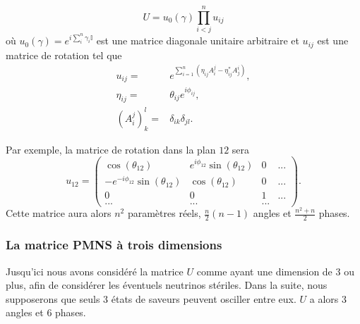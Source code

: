             \begin{equation}\label{eq::compact_pmns}
                U=u_0(\gamma)\prod_{i<j}^n u_{ij}
            \end{equation}
            où $u_0(\gamma)=e^{i \sum_{i}^{n}\gamma_i \mathbb{I}}$ est une matrice diagonale unitaire arbitraire et $u_{ij}$ est une matrice de rotation tel que
            \begin{equation}
                \begin{split}
                    u_{ij}= & e^{\sum_{i=1}^n\left(\eta_{ij}A_i^j-\eta_{ij}^*A_j^i\right)},\\
                    \eta_{ij} = & \theta_{ij}e^{i\phi_{ij}},\\
                    \left(A_i^j\right)_k^l = & \delta_{ik}\delta_{jl}.
                \end{split}
            \end{equation}
            
            Par exemple, la matrice de rotation dans la plan $12$ sera
            \begin{equation}
                u_{12} = 
                \left(\begin{matrix}
                    \cos(\theta_{12}) & e^{i\phi_{12}}\sin(\theta_{12}) & 0 & ... \\
                    -e^{-i\phi_{12}}\sin(\theta_{12}) & \cos(\theta_{12}) & 0 & ... \\
                    0 & 0 & 1 & ... \\
                    ... & ... & ... &
                \end{matrix}\right).
            \end{equation}
            Cette matrice aura alors $n^2$ paramètres réels, $\frac{n}{2}(n-1)$ angles  et $\frac{n^2+n}{2}$ phases.
            
            \subsubsection{La matrice PMNS à trois dimensions}
            Jusqu'ici nous avons considéré la matrice $U$ comme ayant une dimension de 3 ou plus, afin de considérer les éventuels neutrinos stériles. Dans la suite, nous supposerons que seuls 3 états de saveurs peuvent osciller entre eux. $U$ a alors 3 angles et 6 phases.
            
